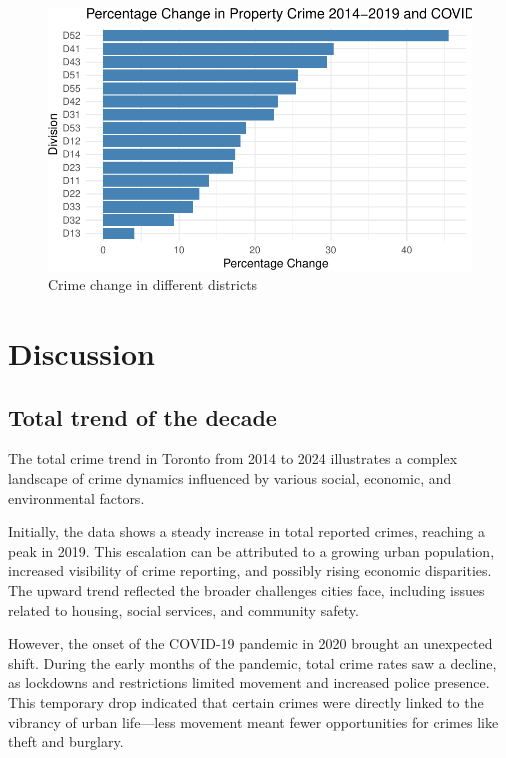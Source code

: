 \documentclass[
  letterpaper,
  DIV=11,
  numbers=noendperiod]{scrartcl}
\begin{document}
\begin{figure}

{\centering \includegraphics{paper_files/figure-pdf/fig-divisioncrimechange-1.pdf}

}

\caption{\label{fig-divisioncrimechange}Crime change in different
districts}

\end{figure}

\hypertarget{discussion}{%
\section{Discussion}\label{discussion}}

\hypertarget{total-trend-of-the-decade}{%
\subsection{Total trend of the decade}\label{total-trend-of-the-decade}}

The total crime trend in Toronto from 2014 to 2024 illustrates a complex
landscape of crime dynamics influenced by various social, economic, and
environmental factors.

Initially, the data shows a steady increase in total reported crimes,
reaching a peak in 2019. This escalation can be attributed to a growing
urban population, increased visibility of crime reporting, and possibly
rising economic disparities. The upward trend reflected the broader
challenges cities face, including issues related to housing, social
services, and community safety.

However, the onset of the COVID-19 pandemic in 2020 brought an
unexpected shift. During the early months of the pandemic, total crime
rates saw a decline, as lockdowns and restrictions limited movement and
increased police presence. This temporary drop indicated that certain
crimes were directly linked to the vibrancy of urban life---less
movement meant fewer opportunities for crimes like theft and burglary.
\end{document}
